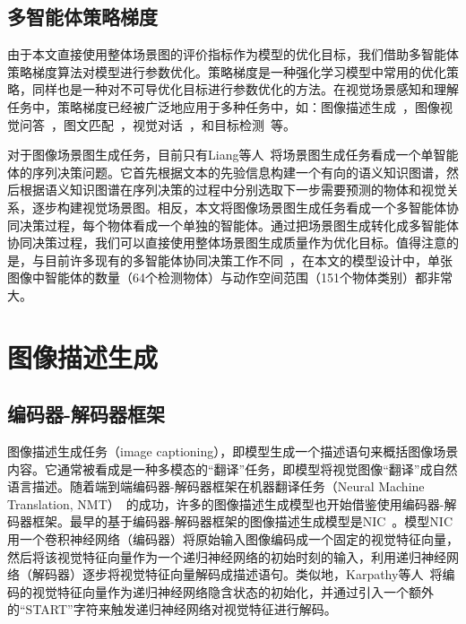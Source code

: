 \subsection{多智能体策略梯度}

由于本文直接使用整体场景图的评价指标作为模型的优化目标，我们借助多智能体策略梯度算法对模型进行参数优化。策略梯度是一种强化学习模型中常用的优化策略，同样也是一种对不可导优化目标进行参数优化的方法。在视觉场景感知和理解任务中，策略梯度已经被广泛地应用于多种任务中，如：图像描述生成~\cite{ranzato2016sequence,ren2017deep,liu2017improved,rennie2017self,zhang2017actor,liu2018context}，图像视觉问答~\cite{hu2017learning,johnson2017inferring}，图文匹配~\cite{chen2017query,yu2017joint}，视觉对话~\cite{das2017learning}，和目标检测~\cite{caicedo2015active,mathe2016reinforcement,jie2016tree}等。

对于图像场景图生成任务，目前只有Liang等人~\cite{liang2017deep}将场景图生成任务看成一个单智能体的序列决策问题。它首先根据文本的先验信息构建一个有向的语义知识图谱，然后根据语义知识图谱在序列决策的过程中分别选取下一步需要预测的物体和视觉关系，逐步构建视觉场景图。相反，本文将图像场景图生成任务看成一个多智能体协同决策过程，每个物体看成一个单独的智能体。通过把场景图生成转化成多智能体协同决策过程，我们可以直接使用整体场景图生成质量作为优化目标。值得注意的是，与目前许多现有的多智能体协同决策工作不同~\cite{foerster2016learning,omidshafiei2017deep}，在本文的模型设计中，单张图像中智能体的数量（64个检测物体）与动作空间范围（151个物体类别）都非常大。


\section{图像描述生成}

\subsection{编码器-解码器框架}

图像描述生成任务（image captioning），即模型生成一个描述语句来概括图像场景内容。它通常被看成是一种多模态的“翻译”任务，即模型将视觉图像“翻译”成自然语言描述。随着端到端编码器-解码器框架在机器翻译任务（Neural Machine Translation, NMT）~\cite{sutskever2014sequence}的成功，许多的图像描述生成模型也开始借鉴使用编码器-解码器框架。最早的基于编码器-解码器框架的图像描述生成模型是NIC~\cite{vinyals2015show}。模型NIC用一个卷积神经网络（编码器）将原始输入图像编码成一个固定的视觉特征向量，然后将该视觉特征向量作为一个递归神经网络的初始时刻的输入，利用递归神经网络（解码器）逐步将视觉特征向量解码成描述语句。类似地，Karpathy等人~\cite{karpathy2015deep}将编码的视觉特征向量作为递归神经网络隐含状态的初始化，并通过引入一个额外的“START”字符来触发递归神经网络对视觉特征进行解码。

